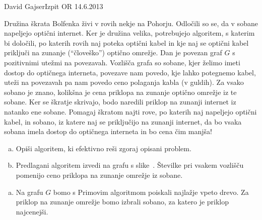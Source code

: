 \begin{naloga}{David Gajser}{Izpit OR 14.6.2013}
\begin{vprasanje}
Družina škrata Bolfenka živi v rovih nekje na Pohorju.
Odločili so se, da v sobane napeljejo optični internet.
Ker je družina velika, potrebujejo algoritem, s katerim bi določili,
po katerih rovih naj poteka optični kabel
in kje naj se optični kabel priključi
na zunanje (``človeško'') optično omrežje.
Dan je povezan graf $G$ s pozitivnimi utežmi na povezavah.
Vozlišča grafa so sobane, kjer želimo imeti dostop do optičnega interneta,
povezave nam povedo, kje lahko potegnemo kabel,
uteži na povezavah pa nam povedo ceno polaganja kabla (v guldih).
Za vsako sobano je znano,
kolikšna je cena priklopa na zunanje optično omrežje iz te sobane.
Ker se škratje skrivajo,
bodo naredili priklop na zunanji internet iz natanko ene sobane.
Pomagaj škratom najti rove, po katerih naj napeljejo optični kabel,
in sobano, iz katere naj se priključijo na zunanji internet,
da bo vsaka sobana imela dostop do optičnega interneta in bo cena čim manjša!

\begin{enumerate}[(a)]
\item Opiši algoritem, ki efektivno reši zgoraj opisani problem.

\item Predlagani algoritem izvedi na grafu s slike~\fig.
Številke pri vsakem vozlišču
pomenijo ceno priklopa na zunanje omrežje iz sobane.
\end{enumerate}

\begin{slika}
\pgfslika
{}
\end{slika}
\end{vprasanje}

\begin{odgovor}
\begin{enumerate}[(a)]
\item Na grafu $G$ bomo s Primovim algoritmom poiskali najlažje vpeto drevo.
Za priklop na zunanje omrežje bomo izbrali sobano,
za katero je priklop najcenejši.


\end{enumerate}
\end{odgovor}
\end{naloga}
